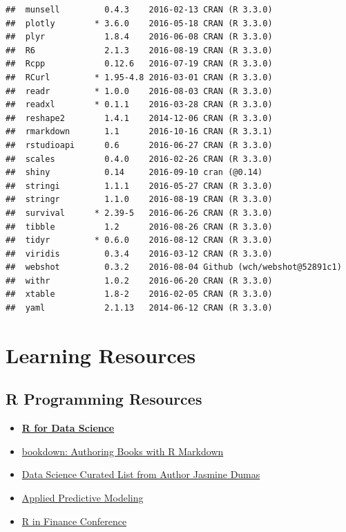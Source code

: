 \documentclass[]{book}
\providecommand{\tightlist}{%
  \setlength{\itemsep}{0pt}\setlength{\parskip}{0pt}}
\begin{document}
\begin{verbatim}
##  munsell         0.4.3    2016-02-13 CRAN (R 3.3.0)                   
##  plotly        * 3.6.0    2016-05-18 CRAN (R 3.3.0)                   
##  plyr            1.8.4    2016-06-08 CRAN (R 3.3.0)                   
##  R6              2.1.3    2016-08-19 CRAN (R 3.3.0)                   
##  Rcpp            0.12.6   2016-07-19 CRAN (R 3.3.0)                   
##  RCurl         * 1.95-4.8 2016-03-01 CRAN (R 3.3.0)                   
##  readr         * 1.0.0    2016-08-03 CRAN (R 3.3.0)                   
##  readxl        * 0.1.1    2016-03-28 CRAN (R 3.3.0)                   
##  reshape2        1.4.1    2014-12-06 CRAN (R 3.3.0)                   
##  rmarkdown       1.1      2016-10-16 CRAN (R 3.3.1)                   
##  rstudioapi      0.6      2016-06-27 CRAN (R 3.3.0)                   
##  scales          0.4.0    2016-02-26 CRAN (R 3.3.0)                   
##  shiny           0.14     2016-09-10 cran (@0.14)                     
##  stringi         1.1.1    2016-05-27 CRAN (R 3.3.0)                   
##  stringr         1.1.0    2016-08-19 CRAN (R 3.3.0)                   
##  survival      * 2.39-5   2016-06-26 CRAN (R 3.3.0)                   
##  tibble          1.2      2016-08-26 CRAN (R 3.3.0)                   
##  tidyr         * 0.6.0    2016-08-12 CRAN (R 3.3.0)                   
##  viridis         0.3.4    2016-03-12 CRAN (R 3.3.0)                   
##  webshot         0.3.2    2016-08-04 Github (wch/webshot@52891c1)     
##  withr           1.0.2    2016-06-20 CRAN (R 3.3.0)                   
##  xtable          1.8-2    2016-02-05 CRAN (R 3.3.0)                   
##  yaml            2.1.13   2014-06-12 CRAN (R 3.3.0)
\end{verbatim}

\chapter{Learning Resources}\label{resources}

\section{R Programming Resources}\label{r-programming-resources}

\begin{itemize}
\tightlist
\item
  \href{http://r4ds.had.co.nz/}{\textbf{R for Data Science}}
\item
  \href{https://bookdown.org/yihui/bookdown/}{bookdown: Authoring Books
  with R Markdown}
\item
  \href{http://jasdumas.github.io/ds-resources/}{Data Science Curated
  List from Author Jasmine Dumas}
\item
  \href{http://appliedpredictivemodeling.com/}{Applied Predictive
  Modeling}
\item
  \href{http://www.rinfinance.com/}{R in Finance Conference}
\end{itemize}
\end{document}
